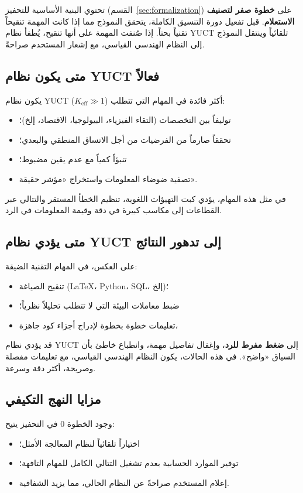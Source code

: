 \documentclass[11pt,a4paper]{article}
\begin{document}
	تحتوي البنية الأساسية للتحفيز (القسم~\ref{sec:formalization}) على \textbf{خطوة صفر لتصنيف الاستعلام}.
	قبل تفعيل دورة التنسيق الكاملة، يتحقق النموذج مما إذا كانت المهمة تنقيحاً تقنياً بحتاً.
	إذا صُنفت المهمة على أنها تنقيح، يُطفأ نظام YUCT تلقائياً وينتقل النموذج إلى النظام الهندسي القياسي، مع إشعار المستخدم صراحةً.
	
	\subsection{متى يكون نظام YUCT فعالاً}
	يكون نظام YUCT (\(K_{\mathrm{eff}} \gg 1\)) أكثر فائدة في المهام التي تتطلب:
	\begin{itemize}
		\item توليفاً بين التخصصات (التقاء الفيزياء، البيولوجيا، الاقتصاد، إلخ)؛
		\item تحققاً صارماً من الفرضيات من أجل الاتساق المنطقي والبعدي؛
		\item تنبؤاً كمياً مع عدم يقين مضبوط؛
		\item تصفية ضوضاء المعلومات واستخراج «مؤشر حقيقة».
	\end{itemize}
	في مثل هذه المهام، يؤدي كبت التهيؤات اللغوية، تنظيم الخطأ المستقر والتتالي عبر القطاعات إلى مكاسب كبيرة في دقة وقيمة المعلومات في الرد.
	
	\subsection{متى يؤدي نظام YUCT إلى تدهور النتائج}
	على العكس، في المهام التقنية الضيقة:
	\begin{itemize}
		\item تنقيح الصياغة (LaTeX، Python، SQL، إلخ)؛
		\item ضبط معاملات البيئة التي لا تتطلب تحليلاً نظرياً؛
		\item تعليمات خطوة بخطوة لإدراج أجزاء كود جاهزة،
	\end{itemize}
	قد يؤدي نظام YUCT إلى \textbf{ضغط مفرط للرد}، وإغفال تفاصيل مهمة، وانطباع خاطئ بأن السياق «واضح». في هذه الحالات، يكون النظام الهندسي القياسي، مع تعليمات مفصلة وصريحة، أكثر دقة وسرعة.
	
	\subsection{مزايا النهج التكيفي}
	وجود الخطوة 0 في التحفيز يتيح:
	\begin{itemize}
		\item اختياراً تلقائياً لنظام المعالجة الأمثل؛
		\item توفير الموارد الحسابية بعدم تشغيل التتالي الكامل للمهام التافهة؛
		\item إعلام المستخدم صراحةً عن النظام الحالي، مما يزيد الشفافية.
	\end{itemize}
	
\end{document}
